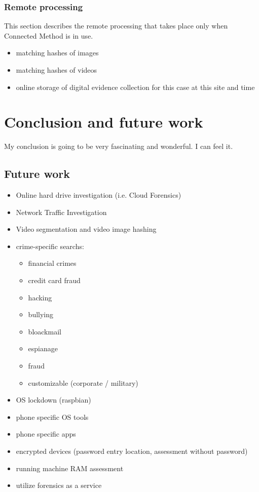 \documentclass[12pt]{article}
\begin{document}
\subsubsection{Remote processing}

This section describes the remote processing that takes place only when Connected Method is in use.
\begin{itemize}
  \item matching hashes of images
  \item matching hashes of videos
  \item online storage of digital evidence collection for this case at this site and time
\end{itemize}

\newpage
\section{Conclusion and future work}
\label{sect-conclusion}

My conclusion is going to be very fascinating and wonderful.  I can feel it.

\subsection{Future work}
\begin{itemize}
  \item Online hard drive investigation (i.e. Cloud Forensics)
  \item Network Traffic Investigation
  \item Video segmentation and video image hashing
  \item crime-specific searchs:
  \begin{itemize}
    \item financial crimes
    \item credit card fraud
    \item hacking
    \item bullying
    \item bloackmail
    \item espianage
    \item fraud
    \item customizable (corporate / military)
  \end{itemize}
  \item OS lockdown (raspbian)
  \item phone specific OS tools
  \item phone specific apps
  \item encrypted devices (password entry location, assessment without password)
  \item running machine RAM assessment
  \item utilize forensics as a service
\end{itemize}
\end{document}
